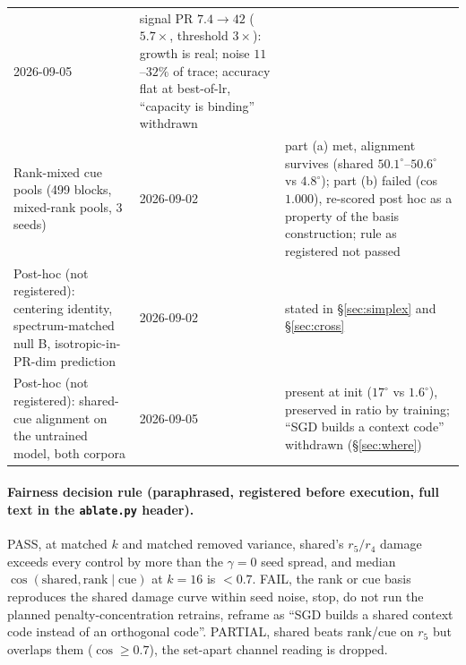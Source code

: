 \documentclass{article}
\newcommand{\degr}{^{\circ}}
\begin{document}
\begin{table}[h]
\begin{tabular}{p{6.6cm}p{1.6cm}p{4.2cm}}
    2026-09-05 & signal PR $7.4\to42$ ($5.7\times$, threshold $3\times$): growth is
    real; noise $11$--$32\%$ of trace; accuracy flat at best-of-lr, ``capacity is
    binding'' withdrawn \\
    Rank-mixed cue pools (499 blocks, mixed-rank pools, 3 seeds) & 2026-09-02 &
    part (a) met, alignment survives (shared $50.1\degr$--$50.6\degr$ vs
    $4.8\degr$); part (b) failed (cos $1.000$), re-scored post hoc as a property of
    the basis construction; rule as registered not passed \\
    Post-hoc (not registered): centering identity, spectrum-matched null B,
    isotropic-in-PR-dim prediction & 2026-09-02 & stated in \S\ref{sec:simplex}
    and \S\ref{sec:cross} \\
    Post-hoc (not registered): shared-cue alignment on the untrained model, both
    corpora & 2026-09-05 & present at init ($17\degr$ vs $1.6\degr$), preserved in
    ratio by training; ``SGD builds a context code'' withdrawn (\S\ref{sec:where}) \\
    \bottomrule
  \end{tabular}
\end{table}

\paragraph{Fairness decision rule (paraphrased, registered before execution, full
text in the \texttt{ablate.py} header).} PASS, at matched $k$ and matched removed
variance, shared's $r_5/r_4$ damage exceeds every control by more than the
$\gamma{=}0$ seed spread, and median
$\cos(\text{shared},\text{rank}\mid\text{cue})$ at $k{=}16$ is $<0.7$. FAIL, the
rank or cue basis reproduces the shared damage curve within seed noise, stop, do not
run the planned penalty-concentration retrains, reframe as ``SGD builds a shared
context code instead of an orthogonal code''. PARTIAL, shared beats rank/cue on
$r_5$ but overlaps them ($\cos\ge0.7$), the set-apart channel reading is dropped.
\end{document}
